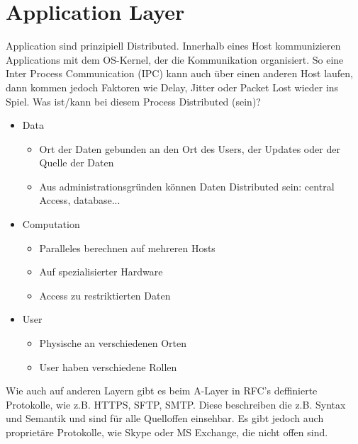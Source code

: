 \section{Application Layer}
	Application sind prinzipiell Distributed. Innerhalb eines Host kommunizieren Applications mit dem OS-Kernel, der die Kommunikation organisiert. So eine Inter Process Communication (IPC) kann auch über einen anderen Host laufen, dann kommen jedoch Faktoren wie Delay, Jitter oder Packet Lost wieder ins Spiel. Was ist/kann bei diesem Process Distributed (sein)?
	\begin{itemize}
		\item Data
			\begin{itemize}
				\item Ort der Daten gebunden an den Ort des Users, der Updates oder der Quelle der Daten
				\item Aus administrationsgründen können Daten Distributed sein: central Access, database...
			\end{itemize}
		\item Computation
			\begin{itemize}
				\item Paralleles berechnen auf mehreren Hosts
				\item Auf spezialisierter Hardware
				\item Access zu restriktierten Daten
			\end{itemize}
		\item User
			\begin{itemize}
				\item Physische an verschiedenen Orten
				\item User haben verschiedene Rollen
			\end{itemize}
	\end{itemize}

	Wie auch auf anderen Layern gibt es beim A-Layer in RFC's deffinierte Protokolle, wie z.B. HTTPS, SFTP, SMTP. Diese beschreiben die z.B. Syntax und Semantik und sind für alle Quelloffen einsehbar. Es gibt jedoch auch proprietäre Protokolle, wie Skype oder MS Exchange, die nicht offen sind. 
